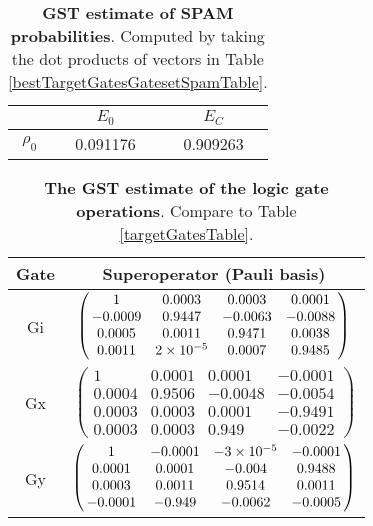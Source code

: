 {\begin{table}[h]
\begin{center}
\begin{tabular}[l]{|c|c|c|}
\hline
 & $E_{0}$ & $E_C$ \\ \hline
$\rho_{0}$ & 0.091176 & 0.909263 \\ \hline
\end{tabular}

\caption{\textbf{GST estimate of SPAM probabilities}.  Computed by taking the dot products of vectors in Table \ref{bestTargetGatesGatesetSpamTable}.\label{bestTargetGatesGatesetSpamParametersTable}}
\end{center}
\end{table}

\begin{table}[h]
\begin{center}
\begin{tabular}[l]{|c|c|}
\hline
Gate & Superoperator (Pauli basis) \\ \hline
Gi & $ \left(\!\!\begin{array}{cccc}
1 & 0.0003 & 0.0003 & 0.0001 \\ 
-0.0009 & 0.9447 & -0.0063 & -0.0088 \\ 
0.0005 & 0.0011 & 0.9471 & 0.0038 \\ 
0.0011 & 2\times 10^{-5} & 0.0007 & 0.9485
 \end{array}\!\!\right) $
 \\ \hline
Gx & $ \left(\!\!\begin{array}{cccc}
1 & 0.0001 & 0.0001 & -0.0001 \\ 
0.0004 & 0.9506 & -0.0048 & -0.0054 \\ 
0.0003 & 0.0003 & 0.0001 & -0.9491 \\ 
0.0003 & 0.0003 & 0.949 & -0.0022
 \end{array}\!\!\right) $
 \\ \hline
Gy & $ \left(\!\!\begin{array}{cccc}
1 & -0.0001 & -3\times 10^{-5} & -0.0001 \\ 
0.0001 & 0.0001 & -0.004 & 0.9488 \\ 
0.0003 & 0.0011 & 0.9514 & 0.0011 \\ 
-0.0001 & -0.949 & -0.0062 & -0.0005
 \end{array}\!\!\right) $
 \\ \hline
\end{tabular}

\caption{\textbf{The GST estimate of the logic gate operations}.  Compare to Table \ref{targetGatesTable}.\label{bestTargetGatesGatesetGatesTable}}
\end{center}
\end{table}

}
